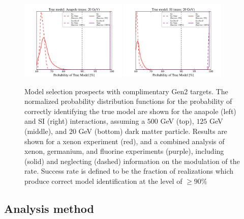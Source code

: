 \documentclass[11pt]{article}
\begin{document}
\begin{figure}
\includegraphics[width=0.45\textwidth]{plots/PDF_Single_20GeV_Anapole_50sims_Xe_vs_FGeXe_GF_TNT.pdf}
\includegraphics[width=0.45\textwidth]{plots/PDF_Single_20GeV_SI_Higgs_50sims_Xe_vs_FGeXe_GF_TNT.pdf}

\caption{\label{fig:gen2}
Model selection prospects with complimentary Gen2 targets. The normalized probability distribution functions for the probability of correctly identifying the true model are shown for the anapole (left) and SI (right) interactions, assuming a $500$ GeV (top), $125$ GeV (middle), and $20$ GeV (bottom) dark matter particle. Results are shown for a xenon experiment (red), and a combined analysis of xenon, germanium, and fluorine experiments (purple), including (solid) and neglecting (dashed) information on the modulation of the rate. Success rate is defined to be the fraction of realizations which produce correct model identification at the level of $ \geq 90\%$}
\end{figure}



\subsection{Analysis method}
\end{document}
